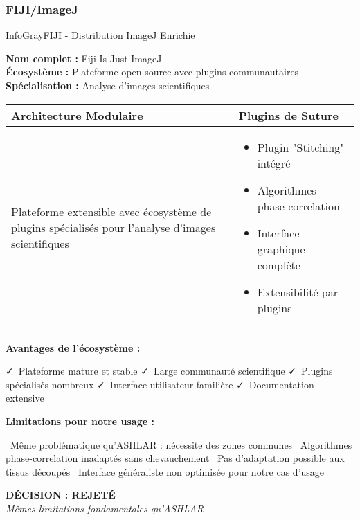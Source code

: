 \documentclass[11pt,a4paper]{report}
\newcommand{\pro}[1]{\textcolor{SuccessGreen}{\faCheck\ #1}}
\newcommand{\con}[1]{\textcolor{DangerRed}{\faTimes\ #1}}
\begin{document}
\subsubsection{FIJI/ImageJ}

\begin{techbox}{InfoGray}{FIJI - Distribution ImageJ Enrichie}

\textbf{Nom complet :} Fiji Is Just ImageJ \\
\textbf{Écosystème :} Plateforme open-source avec plugins communautaires \\
\textbf{Spécialisation :} Analyse d'images scientifiques

\vspace{0.5cm}

\begin{tabularx}{\textwidth}{|X|X|}
\hline
\rowcolor{LightGray}
\textbf{Architecture Modulaire} & \textbf{Plugins de Suture} \\
\hline
Plateforme extensible avec écosystème de plugins spécialisés pour l'analyse d'images scientifiques &
\begin{itemize}[nosep]
\item Plugin "Stitching" intégré
\item Algorithmes phase-correlation
\item Interface graphique complète
\item Extensibilité par plugins
\end{itemize} \\
\hline
\end{tabularx}

\vspace{0.5cm}

\textbf{Avantages de l'écosystème :}
\begin{itemize}[leftmargin=*]
    \pro{Plateforme mature et stable}
    \pro{Large communauté scientifique}
    \pro{Plugins spécialisés nombreux}
    \pro{Interface utilisateur familière}
    \pro{Documentation extensive}
\end{itemize}

\textbf{Limitations pour notre usage :}
\begin{itemize}[leftmargin=*]
    \con{Même problématique qu'ASHLAR : nécessite des zones communes}
    \con{Algorithmes phase-correlation inadaptés sans chevauchement}
    \con{Pas d'adaptation possible aux tissus découpés}
    \con{Interface généraliste non optimisée pour notre cas d'usage}
\end{itemize}

\begin{center}
\textbf{\textcolor{DangerRed}{DÉCISION : REJETÉ}}\\
\textit{Mêmes limitations fondamentales qu'ASHLAR}
\end{center}

\end{techbox}
\end{document}
